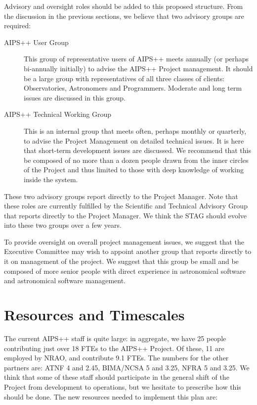 Advisory and oversight roles should be added to this proposed
structure. From the discussion in the previous sections, we believe
that two advisory groups are required:

\begin{description}
\item[AIPS++ User Group] This group of representative users of AIPS++ 
meets annually (or perhaps bi-annually initially) to advise the AIPS++
Project management.  It should be a large group with representatives
of all three classes of clients: Observatories, Astronomers and
Programmers. Moderate and long term issues are discussed in this
group.
\item[AIPS++ Technical Working Group] This is an internal group that
meets often, perhaps monthly or quarterly, to advise the Project
Management on detailed technical issues. It is here that short-term
development issues are discussed. We recommend that this be composed of
no more than a dozen people drawn from the inner circles of the Project
and thus limited to those with deep knowledge of working inside the
system.
\end{description}

These two advisory groups report directly to the Project Manager. Note
that these roles are currently fulfilled by the Scientific and Technical
Advisory Group that reports directly to the Project Manager. We think the
STAG should evolve into these two groups over a few years.

To provide oversight on overall project management issues, we suggest
that the Executive Committee may wish to appoint another group that
reports directly to it on management of the project. We suggest that
this group be small and be composed of more senior people with direct
experience in astronomical software and astronomical software management.

\section{Resources and Timescales}

The current AIPS++ staff is quite large: in aggregate, we have 25
people contributing just over 18 FTEs to the AIPS++ Project. Of these,
11 are employed by NRAO, and contribute 9.1 FTEs. The numbers for the
other partners are: ATNF 4 and 2.45, BIMA/NCSA 5 and 3.25, NFRA 5 and
3.25. We think that some of these staff should participate in the
general shift of the Project from development to operations, but we
hesitate to prescribe how this should be done. The new resources
needed to implement this plan are:

